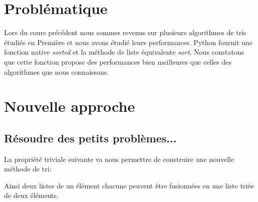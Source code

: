 \documentclass[a4paper,11pt]{article}
\begin{document}
\begin{Form}
\section{Problématique}
Lors du cours précédent nous sommes revenus sur plusieurs algorithmes de tris étudiés en Première et nous avons étudié leurs performances. Python fournit une fonction native \emph{sorted} et la méthode de liste équivalente \emph{sort}. Nous constatons que cette fonction propose des performances bien meilleures que celles des algorithmes que nous connaissons.
\begin{center}
\end{center}
\section{Nouvelle approche}
\subsection{Résoudre des petits problèmes...}
La propriété triviale suivante va nous permettre de construire une nouvelle méthode de tri:
\begin{center}
\end{center}
\begin{figure}[!h]
\centering
{}
\end{figure}
Ainsi deux listes de un élément chacune peuvent être fusionnées en une liste triée de deux éléments.
\begin{figure}[!h]
\centering
{}
\end{figure}
\end{Form}
\end{document}
